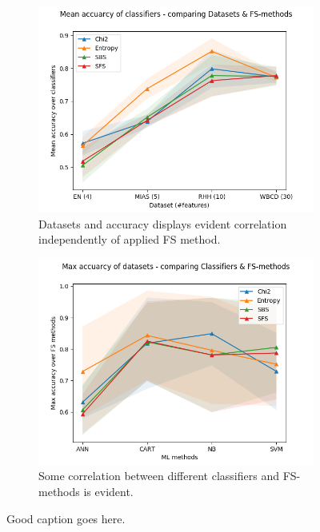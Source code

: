 \begin{figure}[htp]
  \centering
    \begin{subfigure}[b]{0.475\textwidth}
        \centering
        \includegraphics[width=\textwidth]{../plots_with_std_fill/comp_acc_datasets.png}
        \caption[]%
        {{\small Datasets and accuracy displays evident correlation independently of applied FS method.}}
        \label{fig:comp_acc_datasets}
    \end{subfigure}
  \hfill
    \begin{subfigure}[b]{0.475\textwidth}
        \centering
        \includegraphics[width=\textwidth]{../plots_with_std_fill/comp_classif_datasets.png}
        \caption[]%
        {{\small Some correlation between different classifiers and FS-methods is evident.}}
        \label{fig:comp_classif_datasets}
    \end{subfigure}
  \caption[]
  {\small Good caption goes here.}
  \label{fig:anova_plots}
\end{figure}
